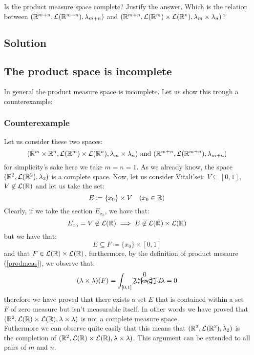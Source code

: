 
\question
Is the product measure space complete? Justify the answer. Which is the relation between $(\mathbb{R}^{m+n}, \mathcal{L}(\mathbb{R}^{m+n}), \lambda_{m+n})$ and $(\mathbb{R}^{m+n}, \mathcal{L}(\mathbb{R}^m) \times \mathcal{L}(\mathbb{R}^n), \lambda_m \times \lambda_n)$?

\subsection*{Solution}

\subsection{The product space is incomplete}
In general the product measure space is incomplete. Let us show this trough a counterexample:

\subsubsection{Counterexample}
Let us consider these two spaces:
\[
    (\mathbb{R}^m \times \mathbb{R}^n, \mathcal{L}(\mathbb{R}^m) \times \mathcal{L}(\mathbb{R}^n), \lambda_m \times \lambda_n ) \text{ and } (\mathbb{R}^{m+n}, \mathcal{L}(\mathbb{R}^{m+n}), \lambda_{m+n})
\]
for simplicity's sake here we take $m=n=1$. As we already know, the space $(\mathbb{R}^2, \mathcal{L}(\mathbb{R}^2), \lambda_2)$ is a complete space. Now, let us consider Vitali'set: $V\subseteq[0,1]$, $V\not\in\mathcal{L}(\mathbb{R})$ and let us take the set:
\[
    E \coloneqq \{ x_0 \} \times V \quad (x_0\in\mathbb{R})    
\]
Clearly, if we take the section $E_{x_0}$, we have that:
\[
    E_{x_0} = V \not\in \mathcal{L}(\mathbb{R}) \implies E \not\in \mathcal{L}(\mathbb{R}) \times \mathcal{L}(\mathbb{R})    
\]
but we have that:
\[
    E \subseteq F \coloneqq \{ x_0 \} \times [0,1]    
\]
and that $F\in \mathcal{L}(\mathbb{R}) \times \mathcal{L}(\mathbb{R})$, furthermore, by the definition of product mesaure (\ref{prodmeas}), we observe that:
\[
    (\lambda \times \lambda)(F) = \int_{[0,1]} \overset{\text{\normalsize0}}{\xcancel{\lambda(\{ x_0 \})}} \, d\lambda = 0    
\]
therefore we have proved that there exists a set $E$ that is contained within a set $F$ of zero measure but isn't measurable itself. In other words we have proved that $(\mathbb{R}^2, \mathcal{L}(\mathbb{R})\times\mathcal{L}(\mathbb{R}), \lambda \times \lambda)$ is not a complete measure space.\\
Futhermore we can observe quite easily that this means that $(\mathbb{R}^2, \mathcal{L}(\mathbb{R}^2), \lambda_2)$ is the completion of $(\mathbb{R}^2, \mathcal{L}(\mathbb{R})\times\mathcal{L}(\mathbb{R}), \lambda \times \lambda)$. This argument can be extended to all pairs of $m$ and $n$.


